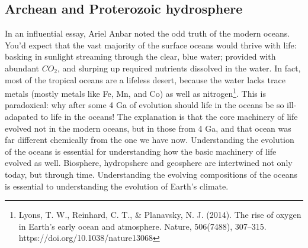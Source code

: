 \documentclass[amstex,12pt]{book}
\begin{document}
{\subsection{Archean and Proterozoic hydrosphere}
In an influential essay, Ariel Anbar noted the odd truth of the modern oceans. You'd expect that the vast majority of the surface oceans would thrive with life: basking in sunlight streaming through the clear, blue water; provided with abundant $CO_2$, and slurping up required nutrients dissolved in the water. In fact, most of the tropical oceans are a lifeless desert, because the water lacks trace metals (mostly metals like Fe, Mn, and Co) as well as nitrogen\footnote{Lyons, T. W., Reinhard, C. T., \& Planavsky, N. J. (2014). The rise of oxygen in Earth’s early ocean and atmosphere. Nature, 506(7488), 307–315. https://doi.org/10.1038/nature13068}. This is paradoxical: why after some 4 Ga of evolution should life in the oceans be so ill-adapated to life in the oceans! The explanation is that the core machinery of life evolved not in the modern oceans, but in those from 4 Ga, and that ocean was far different chemically from the one we have now. Understanding the evolution of the oceans is essential for understanding how the basic machinery of life evolved as well. Biosphere, hydropshere and geosphere are  intertwined not only today, but through time. Understanding the evolving compositions of the oceans is essential to understanding the evolution of Earth's climate.     
}
\end{document}
